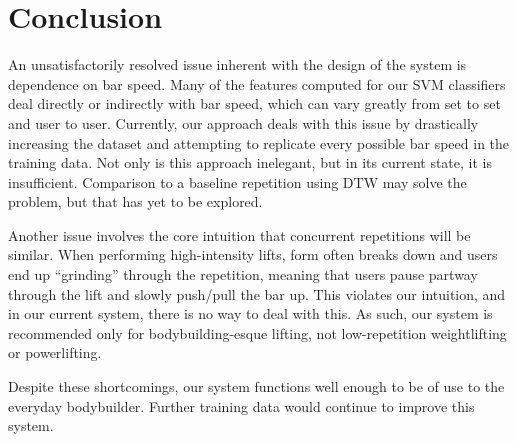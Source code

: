 \chapter{Conclusion}

An unsatisfactorily resolved issue inherent with the design of the system is dependence on bar speed. Many of the features computed for our SVM classifiers deal directly or indirectly with bar speed, which can vary greatly from set to set and user to user. Currently, our approach deals with this issue by drastically increasing the dataset and attempting to replicate every possible bar speed in the training data. Not only is this approach inelegant, but in its current state, it is insufficient. Comparison to a baseline repetition using DTW may solve the problem, but that has yet to be explored.

Another issue involves the core intuition that concurrent repetitions will be similar. When performing high-intensity lifts, form often breaks down and users end up ``grinding'' through the repetition, meaning that users pause partway through the lift and slowly push/pull the bar up. This violates our intuition, and in our current system, there is no way to deal with this. As such, our system is recommended only for bodybuilding-esque lifting, not low-repetition weightlifting or powerlifting.

Despite these shortcomings, our system functions well enough to be of use to the everyday bodybuilder. Further training data would continue to improve this system.